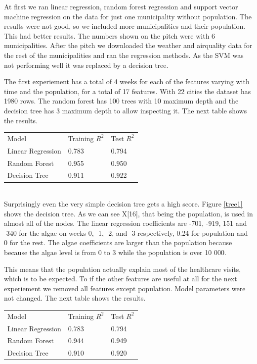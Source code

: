 \documentclass[a4paper, 12pt, english]{article}
\begin{document}
At first we ran linear regression, random forest regression
and support vector machine regression on the data for just
one municipality without population. The results were not good,
so we included more municipalities and their population.
This had better results. The numbers shown on the
pitch were with 6 municipalities. After the pitch we
downloaded the weather and airquality data for
the rest of the municipalities and ran the regression
methods. As the SVM was not performing well it was
replaced by a decision tree.

The first experiement has a total of 4 weeks for
each of the features varying with time and the
population, for a total of
17 features. With 22 cities the dataset has 1980 rows.
The random forest has 100 trees with 10 maximum depth
and the decision tree has 3 maximum depth to allow
inspecting it. The next table shows the results.\\

\begin{tabular}{l l l}
Model & Training \(R^2\) & Test \(R^2\) \\
Linear Regression & 0.783 & 0.794 \\
Random Forest & 0.955 & 0.950 \\
Decision Tree & 0.911 & 0.922 \\
\end{tabular}
\\

Surprisingly even the very simple decision tree
gets a high score.
Figure \ref{tree1} shows the decision tree. As we can see
X[16], that being the population, is used in almost
all of the nodes. The linear regression coefficients
are -701, -919,  151 and -340 for the algae on weeks
0, -1, -2, and -3 respectively, 0.24 for population
and 0 for the rest. The algae coefficients are larger
than the population because because the algae level is from 0 to 3
while the population is over 10 000.

This means that the population actually
explain most of the healthcare visits, which is
to be expected. To if the other features are useful at all
for the next experiement we removed all features
except population. Model parameters were not changed.
The next table shows the results.\\

\begin{tabular}{l l l}
Model & Training \(R^2\) & Test \(R^2\) \\
Linear Regression & 0.783 & 0.794 \\
Random Forest & 0.944 & 0.949 \\
Decision Tree & 0.910 & 0.920 \\
\end{tabular}
\\
\end{document}
